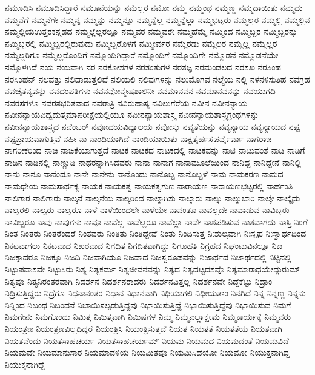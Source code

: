 {ನಮೂದಿಸಿ
ನಮೂದಿಸಿದ್ದಾರೆ
ನಮೂನೆಯನ್ನು
ನಮೆಲ್ಲರ
ನಮೋ
ನಮ್ಮ
ನಮ್ಮಂಥ
ನಮ್ಮಣ್ಣ
ನಮ್ಮದಾಯಿತು
ನಮ್ಮದು
ನಮ್ಮನೆಗೆ
ನಮ್ಮನೆಗೇ
ನಮ್ಮನ್ನ
ನಮ್ಮನ್ನು
ನಮ್ಮನ್ನೂ
ನಮ್ಮನ್ನೆಲ್ಲ
ನಮ್ಮನ್ನೆಲ್ಲಾ
ನಮ್ಮಭಟ್ಟರು
ನಮ್ಮಲ್ಲರ
ನಮ್ಮಲ್ಲಿ
ನಮ್ಮಲ್ಲಿನ
ನಮ್ಮಲ್ಲಿಯಉತ್ತರಕನ್ನಡದ
ನಮ್ಮಲ್ಲೆಲ್ಲರಲ್ಲೂ
ನಮ್ಮವರ
ನಮ್ಮವರೇ
ನಮ್ಮಹೆಮ್ಮೆ
ನಮ್ಮಿಂದ
ನಮ್ಮಿಬ್ಬರ
ನಮ್ಮಿಬ್ಬರನ್ನು
ನಮ್ಮಿಬ್ಬರಲ್ಲಿ
ನಮ್ಮಿಬ್ಬರಲ್ಲಿರುವುದು
ನಮ್ಮಿಬ್ಬರೊಳಗೆ
ನಮ್ಮೀರ್ವರ
ನಮ್ಮೆರಡು
ನಮ್ಮೆಲರ
ನಮ್ಮೆಲ್ಲ
ನಮ್ಮೆಲ್ಲರ
ನಮ್ಮೆಲ್ಲರಿಗೂ
ನಮ್ಮೆಲ್ಲರೊಂದಿಗೆ
ನಮ್ಮೊಂದಿಗಿದ್ದಾರೆ
ನಮ್ಮೊಂದಿಗೆ
ನಮ್ಮೊಂದಿಗೇ
ನಮ್ಮೊಡನೆ
ನಮ್ಮೊಡನೆಯೇ
ನಮ್ಮೊಳಗಿದೆ
ನಯ
ನಯವಾಗಿ
ನರ
ನರಕೋಶಗಳ
ನರತಂತುಗಳ
ನರತಜ್ಞ
ನರಮಂಡಲದ
ನರಸಖ
ನರಸಿಂಹ
ನರಸಿಂಹನ್
ನಲವತ್ತು
ನಲಿದಾಡುತ್ತಲಿದೆ
ನಲಿಯಲಿ
ನಲಿವುಗಳನ್ನು
ನಲುಮೊಗವ
ನಲ್ಮೆಯ
ನಲ್ಲಿ
ನಳನಳಿಸುತಿಹ
ನವಗ್ರಹ
ನವಚೈತನ್ಯವನ್ನು
ನವದಂಪತಿಗಳು
ನವನವೋನ್ಮೇಷಶಾಲಿನೀ
ನವಮಾನವನ
ನವಮಾನವನನ್ನು
ನವಯುಗದಿ
ನವರಸಗಳೂ
ನವರಸಭರಿತವಾದ
ನವರಾತ್ರಿ
ನವಿರುಹಾಸ್ಯ
ನವಿಲುಗೆರೆಯ
ನವೀನ
ನವೀನನ್ಯಾಯ
ನವೀನನ್ಯಾಯವಿದ್ವದುತ್ತಮಾಪರೀಕ್ಷೆಯಲ್ಲಿಯೂ
ನವೀನನ್ಯಾಯಶಾಸ್ತ್ರ
ನವೀನನ್ಯಾಯಶಾಸ್ತ್ರಗ್ರಂಥಗಳನ್ನು
ನವೀನನ್ಯಾಯಶಾಸ್ತ್ರದ
ನವೆಂಬರ್
ನವೋದಯವಿದ್ಯಾಲಯ
ನವೋಸ್ತು
ನವ್ಯತೆಯನ್ನು
ನವ್ಯನ್ಯಾಯ
ನವ್ಯನ್ಯಾಯದ
ನಷ್ಟ
ನಷ್ಟಪ್ರಾಯವಾಗುತ್ತಿವೆ
ನಹೀ
ನಾ
ನಾಂದಿಯಾಗಿದೆ
ನಾಂದಿಯಾಯಿತು
ನಾಕ್ಷತೈರ್ಹಸ್ತಪರ್ವೈರ್ವಾ
ನಾಗರಾಜ
ನಾಗರೀಕರಿಂದ
ನಾಚಿ
ನಾಚಿಕೆಯಾಗುತ್ತದೆ
ನಾಟಕ
ನಾಟಕದ
ನಾಟಕದಲ್ಲಿ
ನಾಟಕವನ್ನು
ನಾಟಿ
ನಾಟುವಂತೆ
ನಾಡಿ
ನಾಡಿಗೆ
ನಾಡಿನ
ನಾಡಿನಲ್ಲಿ
ನಾಣ್ಣುಡಿ
ನಾಥರನ್ನಾಗಿಸಿದವರು
ನಾನಾ
ನಾನಾಗ
ನಾನಾಮೂಲೆಯಿಂದ
ನಾನಿದ್ದ
ನಾನಿದ್ದೇನೆ
ನಾನಿಲ್ಲಿ
ನಾನು
ನಾನೂ
ನಾನೆಂದೂ
ನಾನೇ
ನಾನೇನು
ನಾನೊಂದು
ನಾನೊಬ್ಬ
ನಾನೊಬ್ಬಳೆ
ನಾಮ
ನಾಮಕರಣ
ನಾಮದ
ನಾಮಧೇಯ
ನಾಮಸಾರ್ಥಕ್ಯ
ನಾಯಕ
ನಾಯಕತ್ವ
ನಾಯಕತ್ವಗುಣ
ನಾರಾಯಣ
ನಾರಾಯಣಭಟ್ಟರಲ್ಲಿ
ನಾರ್ಹಂತಿ
ನಾಲಿಗಾರ
ನಾಲಿಗಾರು
ನಾಲ್ಕನೆ
ನಾಲ್ಕನೆಯ
ನಾಲ್ಕರಿಂದ
ನಾಲ್ಕಾಗಿಸು
ನಾಲ್ಕಾರು
ನಾಲ್ಕು
ನಾಲ್ಕುಬಾರಿ
ನಾಲ್ಕೇ
ನಾಲ್ಕೈದು
ನಾಲ್ವರಲಿ
ನಾಲ್ವರು
ನಾಲ್ವರೂ
ನಾಳೆ
ನಾಳೆಯಿಂದಲೇ
ನಾಳೆಯೇ
ನಾವಂತೂ
ನಾವಲ್ಲದೇ
ನಾವಾಡುವ
ನಾವಿಬ್ಬರು
ನಾವಿಬ್ಬರೂ
ನಾವು
ನಾವುಗಳು
ನಾವೂ
ನಾವೆಲ್ಲ
ನಾವೆಲ್ಲರೂ
ನಾವೆಲ್ಲಾ
ನಾವೇ
ನಾಶಪಡಿಸುವ
ನಾಶವಾಗದು
ನಾಸ್ತಿ
ನಿಂಗೆ
ನಿಂತ
ನಿಂತರು
ನಿಂತರೆಂದರೆ
ನಿಂತವರು
ನಿಂತಿತು
ನಿಂತಿದ್ದೇವೆ
ನಿಂತು
ನಿಂದಿಸುತ್ತ
ನಿಃಶುಲ್ಕವಾಗಿ
ನಿಃಸ್ಪೃಹ
ನಿಃಸ್ವಾರ್ಥದಿಂದ
ನಿಕಟವಾಗಲು
ನಿಕಟವಾದ
ನಿಖರವಾದ
ನಿಗದಿತ
ನಿಗದಿತವಾಗಿದ್ದು
ನಿಗೂಹತಿ
ನಿಗ್ರಹದ
ನಿಘಂಟುವಿನಲ್ಲೂ
ನಿಜ
ನಿಜಕ್ಕಾದರೂ
ನಿಜಕ್ಕೂ
ನಿಜದಿ
ನಿಜವಾಗಿಯೂ
ನಿಜವಾದ
ನಿಜಸ್ವರೂಪವನ್ನು
ನಿಜಾರ್ಥದ
ನಿಜಾರ್ಥದಲ್ಲಿ
ನಿಟ್ಟಿನಲ್ಲಿ
ನಿಟ್ಟುಪವಾಸವೇ
ನಿಟ್ಟುಸಿರು
ನಿತ್ಯ
ನಿತ್ಯಕರ್ಮ
ನಿತ್ಯಜೀವನವನ್ನು
ನಿತ್ಯದ
ನಿತ್ಯದಟ್ಟದಸವೊ
ನಿತ್ಯಮಾರಾಧಯೇದ್ಗುರುಮ್
ನಿತ್ಯವೂ
ನಿತ್ಯನಿರಂತರವಾಗಿ
ನಿದರ್ಶನ
ನಿದರ್ಶನರಾದರು
ನಿದರ್ಶನವಿತ್ತಲ್ಲ
ನಿದರ್ಶನವೇ
ನಿದ್ದೆಕೆಟ್ಟು
ನಿದ್ರಾಂ
ನಿದ್ರಿಸುತ್ತಿದ್ದರು
ನಿದ್ರೆಗೂ
ನಿಧನಾನಂತರ
ನಿಧಾನ
ನಿಧಾನವಾಗಿ
ನಿಧಿಯಾಗಲಿ
ನಿಧೀಯತಾಂ
ನಿನಗಿದೆ
ನಿನ್ನ
ನಿನ್ನಣ್ಣ
ನಿನ್ನನು
ನಿನ್ನಿಂದ
ನಿಬಂಧ
ನಿಬಂಧನೆ
ನಿಭಾಯಿಸಲ್ಪಡುತ್ತಿದ್ದವು
ನಿಭಾಯಿಸುತ್ತಿದ್ದೆ
ನಿಭಾಯಿಸುತ್ತಿದ್ದೆವು
ನಿಭಾಯಿಸುವ
ನಿಮಗೆ
ನಿಮಗೇನು
ನಿಮಗೊಂದು
ನಿಮಿತ್ತ
ನಿಮಿತ್ತವಾಗಿ
ನಿಮಿಷಗಳ
ನಿಮ್ಮ
ನಿಮ್ಮಎಲ್ಲಾಕ್ಷೇಮ
ನಿಮ್ಮಕಾರ್ಯಕ್ಕೆ
ನಿಮ್ಮವರು
ನಿಯಂತ್ರಣ
ನಿಯಂತ್ರಣವಿಲ್ಲದಿದ್ದರೆ
ನಿಯಂತ್ರಿಸಿ
ನಿಯಂತ್ರಿಸುತ್ತದೆ
ನಿಯತ
ನಿಯತತೆ
ನಿಯತತೆಯ
ನಿಯತವಾಗಿ
ನಿಯತವೆಂದು
ನಿಯತಸಾಹಚರ್ಯ
ನಿಯತಸಾಹಚರ್ಯಮ್
ನಿಯಮ
ನಿಯಮದ
ನಿಯಮದಂತೆ
ನಿಯಮವಿದೆ
ನಿಯಮವೇ
ನಿಯಮಾನುಸಾರ
ನಿಯಮಾವಳಿಯ
ನಿಯಮಿತವೂ
ನಿಯಮಿಸಿದೆಯೋ
ನಿಯಮೋ
ನಿಯುಕ್ತನಾಗಿದ್ದ
ನಿಯುಕ್ತನಾಗಿದ್ದೆ
}
